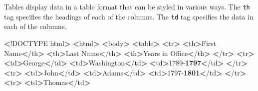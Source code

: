 \documentclass[]{book}
\newenvironment{Shaded}{\begin{snugshade}}{\end{snugshade}}
\newcommand{\FunctionTok}[1]{\textcolor[rgb]{0.00,0.00,0.00}{#1}}
\newcommand{\OperatorTok}[1]{\textcolor[rgb]{0.81,0.36,0.00}{\textbf{#1}}}
\newcommand{\ExtensionTok}[1]{#1}
\newcommand{\NormalTok}[1]{#1}
\begin{document}
Tables display data in a table format that can be styled in various
ways. The \texttt{th} tag specifies the headings of each of the columns.
The \texttt{td} tag specifies the data in each of the columns.

\begin{Shaded}
\begin{Highlighting}[]
\OperatorTok{<}\NormalTok{!}\ExtensionTok{DOCTYPE}\NormalTok{ html}\OperatorTok{>}         
\OperatorTok{<}\ExtensionTok{html}\OperatorTok{>}                  
    \OperatorTok{<}\ExtensionTok{body}\OperatorTok{>}              
        \OperatorTok{<}\ExtensionTok{table}\OperatorTok{>}                         
            \OperatorTok{<}\FunctionTok{tr}\OperatorTok{>}                        
                \OperatorTok{<}\ExtensionTok{th}\OperatorTok{>}\NormalTok{First Name}\OperatorTok{<}\NormalTok{/th}\OperatorTok{>}     
                \OperatorTok{<}\ExtensionTok{th}\OperatorTok{>}\NormalTok{Last Name}\OperatorTok{<}\NormalTok{/th}\OperatorTok{>}      
                \OperatorTok{<}\ExtensionTok{th}\OperatorTok{>}\NormalTok{Years in Office}\OperatorTok{<}\NormalTok{/th}\OperatorTok{>}
            \OperatorTok{<}\NormalTok{/}\ExtensionTok{tr}\OperatorTok{>}                       
            \OperatorTok{<}\FunctionTok{tr}\OperatorTok{>}                        
                \OperatorTok{<}\ExtensionTok{td}\OperatorTok{>}\NormalTok{George}\OperatorTok{<}\NormalTok{/td}\OperatorTok{>}         
                \OperatorTok{<}\ExtensionTok{td}\OperatorTok{>}\NormalTok{Washington}\OperatorTok{<}\NormalTok{/td}\OperatorTok{>}     
                \OperatorTok{<}\ExtensionTok{td}\OperatorTok{>}\NormalTok{1789-}\OperatorTok{1797<}\NormalTok{/td}\OperatorTok{>}      
            \OperatorTok{<}\NormalTok{/}\ExtensionTok{tr}\OperatorTok{>}                       
            \OperatorTok{<}\FunctionTok{tr}\OperatorTok{>}                        
                \OperatorTok{<}\ExtensionTok{td}\OperatorTok{>}\NormalTok{John}\OperatorTok{<}\NormalTok{/td}\OperatorTok{>}           
                \OperatorTok{<}\ExtensionTok{td}\OperatorTok{>}\NormalTok{Adams}\OperatorTok{<}\NormalTok{/td}\OperatorTok{>}          
                \OperatorTok{<}\ExtensionTok{td}\OperatorTok{>}\NormalTok{1797-}\OperatorTok{1801<}\NormalTok{/td}\OperatorTok{>}      
            \OperatorTok{<}\NormalTok{/}\ExtensionTok{tr}\OperatorTok{>}                       
            \OperatorTok{<}\FunctionTok{tr}\OperatorTok{>}                        
                \OperatorTok{<}\ExtensionTok{td}\OperatorTok{>}\NormalTok{Thomas}\OperatorTok{<}\NormalTok{/td}\OperatorTok{>}         

\end{Highlighting}
\end{Shaded}
\end{document}
